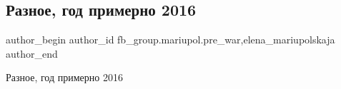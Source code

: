  
 
 
 
 

\subsection{Разное, год примерно 2016}
\label{sec:17_02_2023.fb.fb_group.mariupol.pre_war.2.raznoe__god_primerno}
 
\ifcmt
 author_begin
   author_id fb_group.mariupol.pre_war,elena_mariupolskaja
 author_end
\fi

Разное, год примерно 2016
